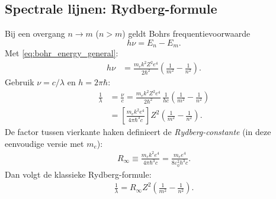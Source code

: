 \documentclass{report} %
\begin{document}
    \subsection{Spectrale lijnen: Rydberg-formule}
    Bij een overgang $n\to m$ ($n>m$) geldt Bohrs frequentievoorwaarde
    \[
        h\nu = E_n - E_m.
    \]
    Met \eqref{eq:bohr_energy_general}:
    \begin{align}
        h\nu
        &= \frac{m_e k^2 Z^2 e^4}{2\hbar^2}\left(\frac{1}{m^2}-\frac{1}{n^2}\right).
    \end{align}
    Gebruik $\nu=c/\lambda$ en $h=2\pi\hbar$:
    \begin{align}
        \frac{1}{\lambda}
        &= \frac{\nu}{c}
        = \frac{m_e k^2 Z^2 e^4}{2\hbar^2}\,\frac{1}{h c}\left(\frac{1}{m^2}-\frac{1}{n^2}\right)
        \\
        &= \left[\frac{m_e k^2 e^4}{4\pi\hbar^3 c}\right] Z^2
        \left(\frac{1}{m^2}-\frac{1}{n^2}\right).
    \end{align}
    De factor tussen vierkante haken definieert de \emph{Rydberg-constante} (in deze eenvoudige versie met $m_e$):
    \begin{align}
        R_\infty \equiv \frac{m_e k^2 e^4}{4\pi\hbar^3 c}
        = \frac{m_e e^4}{8\varepsilon_0^2 h^3 c}.
    \end{align}
    Dan volgt de klassieke Rydberg-formule:
    \begin{align}
        \frac{1}{\lambda} = R_\infty Z^2\left(\frac{1}{m^2}-\frac{1}{n^2}\right).
    \end{align}
\end{document}
